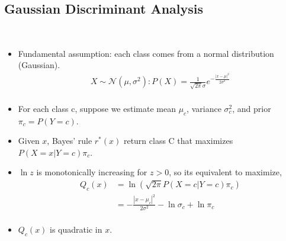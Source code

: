 \documentclass[10pt]{article}
\begin{document}
	\subsection*{Gaussian Discriminant Analysis}
		\
		\begin{itemize}
			\item Fundamental assumption: each class comes from a normal distribution (Gaussian).
				\begin{align*}
					X \sim \mathcal{N}(\mu, \sigma^{2}):
					P(X) = \frac{1}{\sqrt{2\pi}\sigma} e^{-\frac{|x-\mu|^{2}}{2\sigma^{2}}}\\ 
				\end{align*}
			\item For each class c, suppose we estimate mean $\mu_{c}$, variance $\sigma_{c}^{2}$, and prior $\pi_{c} = P(Y=c)$.
			\item Given $x$, Bayes' rule $r^{*}(x)$ return class C that maximizes $P(X=x|Y=c)\pi_{c}$.
			\item $\ln z$ is monotonically increasing for $z > 0$, so its equivalent to maximize,
				\begin{align*}
					Q_{c}(x) &= \ln(\sqrt{2\pi}P(X=c|Y=c)\pi_{c})\\
							&= -\frac{|x-\mu_{c}|^{2}}{2\sigma^{2}} - \ln \sigma_{c} + \ln \pi_{c}\\
				\end{align*}
			\item $Q_{c}(x)$ is quadratic in $x$.
		\end{itemize}
	
\end{document}
